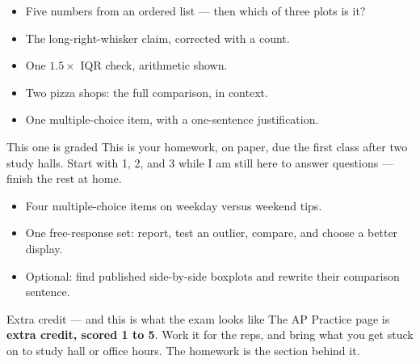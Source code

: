 \documentclass[aspectratio=169, 11pt]{beamer}
\begin{document}
\begin{frame}[t, plain]
  \begin{itemize}\setlength{\itemsep}{5pt}
    \item Five numbers from an ordered list --- then which of three plots is it?
    \item The long-right-whisker claim, corrected with a count.
    \item One $1.5 \times$ IQR check, arithmetic shown.
    \item Two pizza shops: the full comparison, in context.
    \item One multiple-choice item, with a one-sentence justification.
  \end{itemize}
  \begin{block}{This one is graded}
    This is your  homework, on paper, due the first class after two study halls.
    Start with 1, 2, and 3 while I am still here to answer questions --- finish the rest at home.
  \end{block}
\end{frame}

\begin{frame}[t, plain]
  \begin{itemize}\setlength{\itemsep}{5pt}
    \item Four multiple-choice items on weekday versus weekend tips.
    \item One free-response set: report, test an outlier, compare, and choose a better display.
    \item Optional: find published side-by-side boxplots and rewrite their comparison sentence.
  \end{itemize}
  \begin{block}{Extra credit --- and this is what the exam looks like}
    The AP Practice page is \textbf{extra credit, scored 1 to 5}. Work it for the reps, and bring what you get
    stuck on to study hall or office hours. The  homework is the section behind
    it.
  \end{block}
\end{frame}
\end{document}
